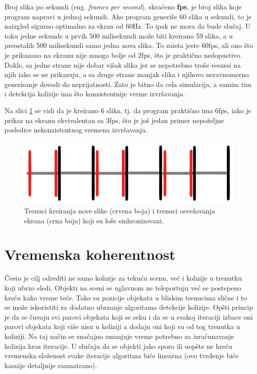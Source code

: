 \documentclass[12pt,oneside]{memoir}
\begin{document}
Broj slika po sekundi (eng. {\em frames per second}), skraćeno \textbf{fps}, je broj slika koje program napravi u jednoj sekundi.
Ako program generiše 60 slika u sekundi, to je naizgled sigurno optimalno za ekran od 60Hz.
To ipak ne mora da bude slučaj.
U toku jedne sekunde u prvih 500 milisekundi može biti kreirano 59 slika, a u preostalih 500 milisekundi samo jedna nova slika. 
To zaista jeste 60fps, ali ono što je prikazano na ekranu nije mnogo bolje od 2fps, 
što je praktično nedopustivo. 
Dakle, sa jedne strane nije dobar višak slika jer se nepotrebno troše resursi na njih iako se ne prikazuju, 
a sa druge strane manjak slika i njihovo neravnomerno generisanje dovodi do neprijatnosti.
Zato je bitno da cela simulacija, a samim tim i detekcija kolizije ima što konzistentnije vreme izvršavanja.

Na slici \ref{fig:fpsdiv2} se vidi da je kreirano 6 slika, tj. da program praktično ima 6fps, iako je prikaz na ekranu 
ekvivalentan sa 3fps, što je još jedan primer nepoželjne posledice nekonzistentnog vremena izvršavanja. 

\begin{figure}[h!]
	\centering
	\includegraphics[scale=0.5]{fpsdiv2.png}
	\caption{ Trenuci kreiranja nove slike (crvena boja) i trenuci osvežavanja ekrana (crna boja) koji su loše sinhronizovani. }
	\label{fig:fpsdiv2}
\end{figure}

\section{Vremenska koherentnost}

Često je cilj odrediti ne samo kolizije za tekuću scenu, već i kolizije u trenutku koji ubrzo sledi.
Objekti na sceni se uglavnom ne teleportuju već se postepeno kreću kako vreme teče.
Tako su pozicije objekata u bliskim trenucima slične i to se može iskoristiti za dodatno ubrzanje algoritama detekcije kolizije. 
Opšti princip je da se čuvaju svi parovi objekata koji se seku i da se u svakoj iteraciji 
izbace oni parovi objekata koji više nisu u koliziji a dodaju oni koji su od tog trenutka u koliziji.
Na taj način se značajno smanjuje vreme potrebno za izračunavanje kolizija kroz iteracije.
U slučaju da se objekti jako sporo ili uopšte ne kreću 
vremenska složenost svake iteracije algoritma biće linearna (ovo tvrđenje biće kasnije detaljnije razmatrano).
\end{document}
